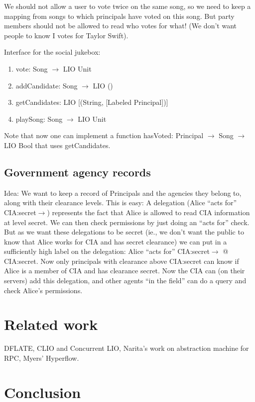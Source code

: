 \documentclass[conference]{IEEEtran}
\begin{document}
We should not allow a user to vote twice on the same song, so we need to keep a mapping from songs to which principals have voted on this song. But party members should not be allowed to read who votes for what! (We don't want people to know I votes for Taylor Swift).

Interface for the social jukebox:
\begin{enumerate}
    \item \textsf{vote: Song $\rightarrow$ LIO Unit}
    \item \textsf{addCandidate: Song $\rightarrow$ LIO ()}
    \item \textsf{getCandidates: LIO [(String, [Labeled Principal])]}
    \item \textsf{playSong: Song $\rightarrow$ LIO Unit}
\end{enumerate}
Note that now one can implement a function \textsf{hasVoted: Principal $\rightarrow$ Song $\rightarrow$ LIO Bool} that uses \textsf{getCandidates}.

\subsection{Government agency records}
Idea: We want to keep a record of Principals and the agencies they belong to, along with their clearance levels. This is easy: A delegation (Alice ``acts for'' CIA:secret$\rightarrow$) represents the fact that Alice is allowed to read CIA information at level secret. We can then check permissions by just doing an ``acts for'' check. But as we want these delegations to be secret (ie., we don't want the public to know that Alice works for CIA and has secret clearance) we can put in a sufficiently high label on the delegation:
Alice ``acts for'' CIA:secret$\rightarrow$ @ CIA:secret. Now only principals with clearance above CIA:secret can know if Alice is a member of CIA and has clearance secret.
Now the CIA can (on their servers) add this delegation, and other agents ``in the field'' can do a query and check Alice's permissions.

\section{Related work}
DFLATE, CLIO and Concurrent LIO, Narita's work on abstraction machine for RPC, Myers' Hyperflow.

\section{Conclusion}




\vspace{12pt}
\end{document}
